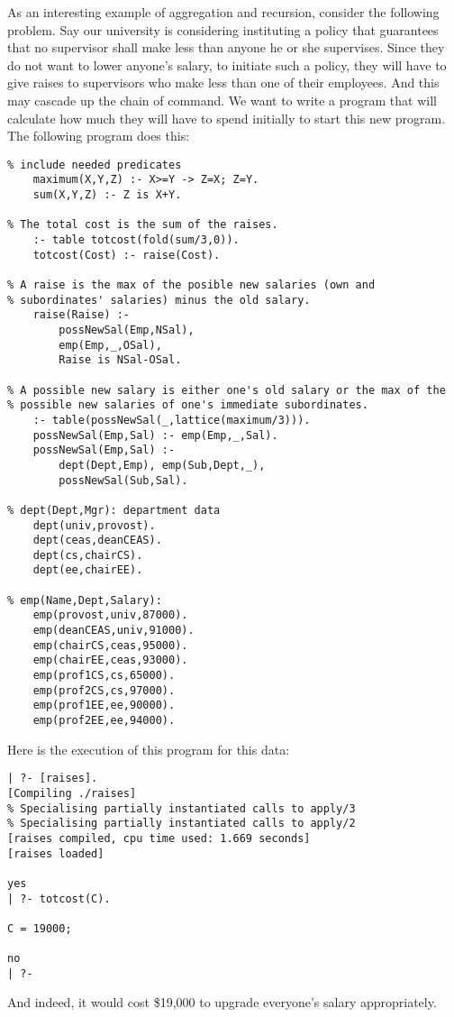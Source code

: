 As an interesting example of aggregation and recursion, consider the
following problem.  Say our university is considering instituting a
policy that guarantees that no supervisor shall make less than anyone
he or she supervises.  Since they do not want to lower anyone's
salary, to initiate such a policy, they will have to give raises to
supervisors who make less than one of their employees.  And this may
cascade up the chain of command.  We want to write a program that will
calculate how much they will have to spend initially to start this new
program.  The following program does this:
\begin{verbatim}
% include needed predicates
    maximum(X,Y,Z) :- X>=Y -> Z=X; Z=Y.
    sum(X,Y,Z) :- Z is X+Y.

% The total cost is the sum of the raises.
    :- table totcost(fold(sum/3,0)).
    totcost(Cost) :- raise(Cost).

% A raise is the max of the posible new salaries (own and
% subordinates' salaries) minus the old salary.
    raise(Raise) :- 
        possNewSal(Emp,NSal),
        emp(Emp,_,OSal), 
        Raise is NSal-OSal.

% A possible new salary is either one's old salary or the max of the
% possible new salaries of one's immediate subordinates.
    :- table(possNewSal(_,lattice(maximum/3))).
    possNewSal(Emp,Sal) :- emp(Emp,_,Sal).
    possNewSal(Emp,Sal) :- 
        dept(Dept,Emp), emp(Sub,Dept,_), 
        possNewSal(Sub,Sal).

% dept(Dept,Mgr): department data
    dept(univ,provost).
    dept(ceas,deanCEAS).
    dept(cs,chairCS).
    dept(ee,chairEE).

% emp(Name,Dept,Salary):
    emp(provost,univ,87000).
    emp(deanCEAS,univ,91000).
    emp(chairCS,ceas,95000).
    emp(chairEE,ceas,93000).
    emp(prof1CS,cs,65000).
    emp(prof2CS,cs,97000).
    emp(prof1EE,ee,90000).
    emp(prof2EE,ee,94000).
\end{verbatim}

Here is the execution of this program for this data:
\begin{verbatim}
| ?- [raises].
[Compiling ./raises]
% Specialising partially instantiated calls to apply/3
% Specialising partially instantiated calls to apply/2
[raises compiled, cpu time used: 1.669 seconds]
[raises loaded]

yes
| ?- totcost(C).

C = 19000;

no
| ?- 
\end{verbatim}
And indeed, it would cost \$19,000 to upgrade everyone's salary
appropriately.

